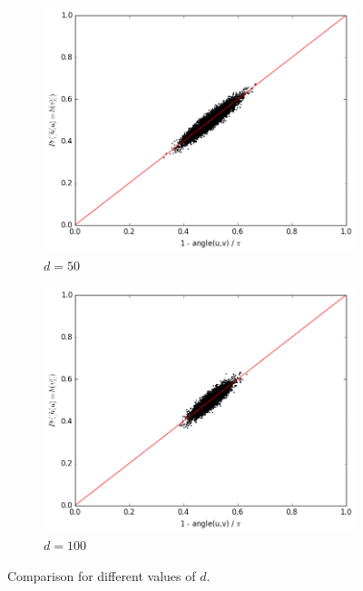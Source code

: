 \documentclass{ethz_report}
\begin{document}
\begin{figure}[h]
\begin{subfigure}[b]{.5\textwidth}
    \includegraphics[width=1\linewidth]{../code/simulation_vs_similarity_50.png}
    \caption{$d = 50$}
\end{subfigure}%
\begin{subfigure}[b]{.5\textwidth}
    \includegraphics[width=1\linewidth]{../code/simulation_vs_similarity_100.png}
    \caption{$d = 100$}
\end{subfigure}
\caption{Comparison for different values of $d$.}
\label{fig:comparison_d}
\end{figure}
\end{document}
